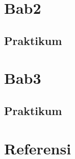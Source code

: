 \documentclass[
]{book}
\begin{document}
\chapter{Bab2}\label{bab2}

\section{Praktikum}\label{praktikum-1}

\chapter{Bab3}\label{bab3}

\section{Praktikum}\label{praktikum-2}

\chapter{Referensi}\label{referensi}

  
\end{document}
